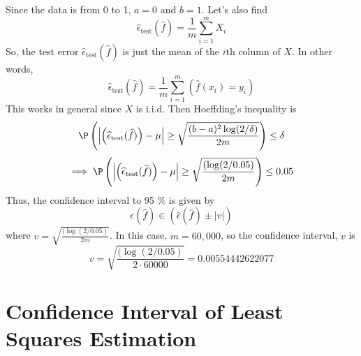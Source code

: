 \documentclass[shortlabels]{article}
\begin{document}
\begin{bprob}
\begin{itemize}
        Since the data is from 0 to 1, $a=0$ and $b=1$. Let's also find 
        $$ \widehat{\epsilon}_{\textrm{test}}(\widehat{f}) = \frac{1}{m} \sum_{i=1}^m X_i $$
        So, the test error $\widehat{\epsilon}_{\textrm{test}}(\widehat{f}) $ is just the mean of the $i$th column of $X$. In other words, 
        \begin{equation*}
            \widehat{\epsilon}_{\textrm{test}}(\widehat{f}) = \frac{1}{m} \sum_{i=1}^m (\widehat{f}(x_i) = y_i)
        \end{equation*}
        This works in general since $X$ is i.i.d. Then Hoeffding's inequality is 
        \begin{equation*}
            \P\left( \left| \left( \widehat{\epsilon}_{\textrm{test}}(\widehat{f}) \right)- \mu \right| \geq \sqrt{\frac{(b-a)^2\log(2/\delta)}{2m}} \right) \leq \delta
        \end{equation*}
        \begin{equation*}
            \implies \P\left( \left| \left( \widehat{\epsilon}_{\textrm{test}}(\widehat{f}) \right)- \mu \right| \geq \sqrt{\frac{(\log(2/0.05)}{2m}} \right) \leq 0.05
        \end{equation*}
        Thus, the confidence interval to 95 \% is given by 
        $$ \epsilon(\widehat{f}) \in (\widehat{\epsilon}(\widehat{f})\pm |v|) $$ 
        where $ v = \sqrt{\frac{(\log(2/0.05)}{2m}} $. In this case, $m = 60,000$, so 
        the confidence interval, $v$ is 
        $$ v = \sqrt{\frac{(\log(2/0.05)}{2\cdot 60000}} =  0.00554442622077 $$
    \end{itemize}
\end{bprob}

\newpage
\section*{Confidence Interval of Least Squares Estimation}
\end{document}
